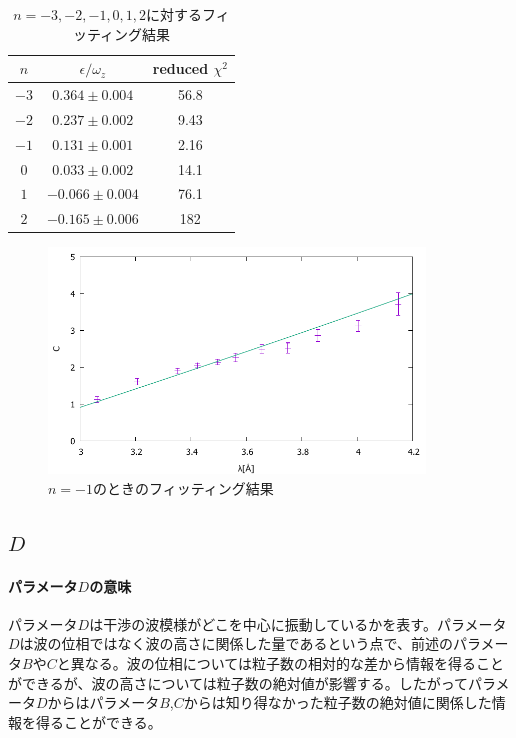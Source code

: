 \begin{table}[H]
\centering
\caption{$n=-3,-2,-1,0,1,2$に対するフィッティング結果}\label{analysis_tbl_Cfit}
\begin{tabular}{ccc}
$n$&$\epsilon/\omega_z$&reduced $\chi^2$\\ \hline
$-3$	&$0.364 \pm0.004$ 	&56.8 \\
$-2$	&$0.237 \pm0.002$ 	&9.43 \\
$-1$	&$0.131 \pm0.001$ 	&2.16 \\
$0$	&$0.033 \pm0.002$ 	&14.1 \\
$1$	&$-0.066 \pm0.004$ 	&76.1 \\
$2$	&$-0.165 \pm0.006$ 	&182\\ \hline
\end{tabular}
\end{table}
\begin{figure}[h]
\centering
\includegraphics[width=10cm]{analysis/C/C_F_fit.pdf}
\caption{$n=-1$のときのフィッティング結果}\label{analysis_fig_Cfit}
\end{figure}

\subsection{$D$}
\paragraph{パラメータ$D$の意味}
パラメータ$D$は干渉の波模様がどこを中心に振動しているかを表す。パラメータ$D$は波の位相ではなく波の高さに関係した量であるという点で、前述のパラメータ$B$や$C$と異なる。波の位相については粒子数の相対的な差から情報を得ることができるが、波の高さについては粒子数の絶対値が影響する。したがってパラメータ$D$からはパラメータ$B$,$C$からは知り得なかった粒子数の絶対値に関係した情報を得ることができる。

